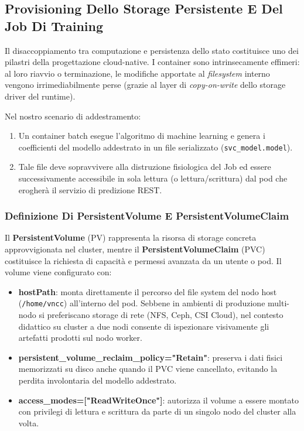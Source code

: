 \documentclass[11pt, a4paper]{article}
\begin{document}
\subsection{Provisioning Dello Storage Persistente E Del Job Di Training}

Il disaccoppiamento tra computazione e persistenza dello stato costituisce uno dei pilastri della progettazione cloud-native. I container sono intrinsecamente effimeri: al loro riavvio o terminazione, le modifiche apportate al \emph{filesystem} interno vengono irrimediabilmente perse (grazie al layer di \emph{copy-on-write} dello storage driver del runtime).

Nel nostro scenario di addestramento:
\begin{enumerate}[noitemsep]
    \item Un container batch esegue l'algoritmo di machine learning e genera i coefficienti del modello addestrato in un file serializzato (\texttt{svc\_model.model}).
    \item Tale file deve sopravvivere alla distruzione fisiologica del Job ed essere successivamente accessibile in sola lettura (o lettura/scrittura) dal pod che erogherà il servizio di predizione REST.
\end{enumerate}

\subsubsection{Definizione Di PersistentVolume E PersistentVolumeClaim}

Il \textbf{PersistentVolume} (PV) rappresenta la risorsa di storage concreta approvvigionata nel cluster, mentre il \textbf{PersistentVolumeClaim} (PVC) costituisce la richiesta di capacità e permessi avanzata da un utente o pod. Il volume viene configurato con:
\begin{itemize}[noitemsep]
    \item \textbf{hostPath}: monta direttamente il percorso del file system del nodo host (\texttt{/home/vncc}) all'interno del pod. Sebbene in ambienti di produzione multi-nodo si preferiscano storage di rete (NFS, Ceph, CSI Cloud), nel contesto didattico su cluster a due nodi consente di ispezionare visivamente gli artefatti prodotti sul nodo worker.
    \item \textbf{persistent\_volume\_reclaim\_policy="Retain"}: preserva i dati fisici memorizzati su disco anche quando il PVC viene cancellato, evitando la perdita involontaria del modello addestrato.
    \item \textbf{access\_modes=["ReadWriteOnce"]}: autorizza il volume a essere montato con privilegi di lettura e scrittura da parte di un singolo nodo del cluster alla volta.
\end{itemize}
\end{document}
